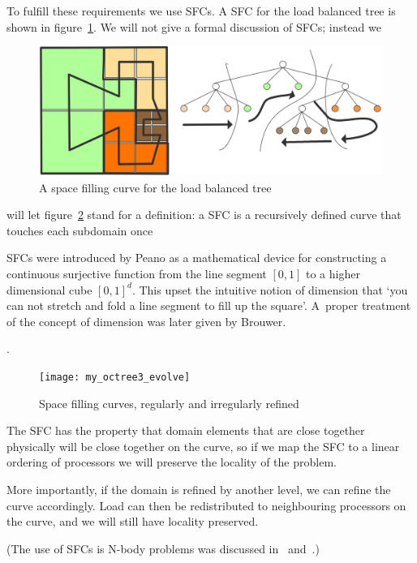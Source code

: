To fulfill these requirements we use \acfp{SFC}. A \acf{SFC} for the
load balanced tree is shown in figure~\ref{fig:octree-sfc}. We will
not give a formal discussion of \acp{SFC}; instead we
\begin{figure}[ht]
  \includegraphics[scale=.18]{graphics/my_octree3}
  \caption{A space filling curve for the load balanced tree}
  \label{fig:octree-sfc}
\end{figure}
will let figure~\ref{fig:octree3} stand for a definition: a \ac{SFC} is a
recursively defined curve that touches each subdomain
once
\begin{footnoteenv}
  {\acfp{SFC} were introduced by Peano as a mathematical
  device for constructing a continuous surjective function from the
  line segment $[0,1]$ to a higher dimensional cube $[0,1]^d$. This
  upset the intuitive notion of dimension that `you can not stretch
  and fold a line segment to fill up the square'. A~proper treatment
  of the concept of dimension was later given by Brouwer.}
\end{footnoteenv}
.
\begin{figure}[ht]
  \texttt{[image: my\_octree3\_evolve]}
  \caption{Space filling curves, regularly and irregularly refined}
  \label{fig:octree3}
\end{figure}
The \ac{SFC} has the property that domain elements that are close
together physically will be close together on the curve, so if we map
the \ac{SFC} to a linear ordering of processors we will preserve the
locality of the problem. 

More importantly, if the domain is refined by
another level, we can refine the curve accordingly. Load can then be
redistributed to neighbouring processors on the curve, and we will
still have locality preserved.

(The use of \acfp{SFC} is N-body problems was
discussed in~\cite{Warren:1993:hash-octree} and~\cite{Springel:gadget}.)


